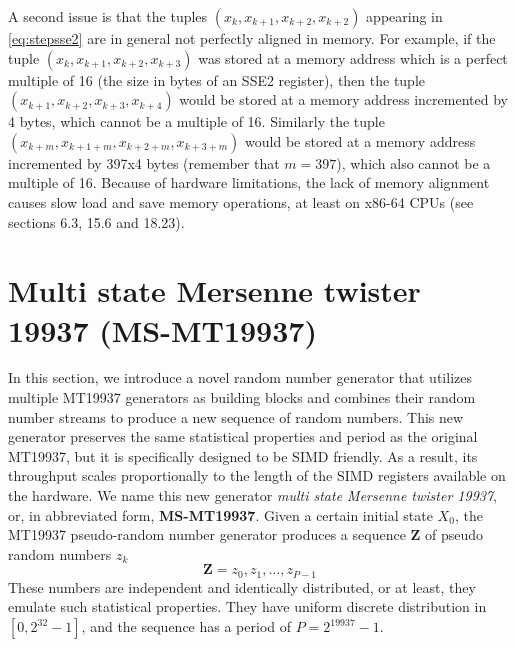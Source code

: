 \documentclass[preprint,1p,times]{elsarticle}
\begin{document}
A second issue is that the tuples $(x_k, x_{k+1}, x_{k+2}, x_{k+2})$ appearing in \eqref{eq:stepsse2} are in general not perfectly aligned in memory. For example, if the tuple $(x_k, x_{k+1}, x_{k+2}, x_{k+3})$ was stored at a memory address which is a perfect multiple of 16 (the size in bytes of an SSE2 register), then the tuple $(x_{k+1}, x_{k+2}, x_{k+3}, x_{k+4})$ would be stored at a memory address incremented by 4 bytes, which cannot be a multiple of 16. Similarly the tuple $(x_{k+m}, x_{k+1+m}, x_{k+2+m}, x_{k+3+m})$ would be stored at a memory address incremented by 397x4 bytes (remember that $m=397$), which also cannot  be a multiple of 16. Because of hardware limitations, the lack of memory alignment causes slow load and save memory operations, at least on x86-64 CPUs (see \cite{intel} sections 6.3, 15.6 and 18.23).

\section{Multi state Mersenne twister 19937 (MS-MT19937)}
\label{sec:simdgen}
\noindent In this section, we introduce a novel random number generator that utilizes multiple MT19937 generators as building blocks and combines their random number streams to produce a new sequence of random numbers. This new generator preserves the same statistical properties and period as the original MT19937, but it is specifically designed to be SIMD friendly. As a result, its throughput scales proportionally to the length of the SIMD registers available on the hardware. We name this new generator \textit{multi state Mersenne twister 19937}, or, in abbreviated form, \textbf{MS-MT19937}.
Given a certain initial state $X_0$, the MT19937 pseudo-random number generator produces a sequence $\boldsymbol{Z}$ of pseudo random numbers $z_k$
\begin{equation}
\label{eq:mainseq}
   \boldsymbol{Z} = z_0, z_1, \dots, z_{P-1} 
\end{equation}
These numbers are independent and identically distributed, or at least, they emulate such statistical properties. They have uniform discrete distribution in $[0, 2^{32}-1]$, and the sequence has a period of $P=2^{19937}-1$.
\end{document}

